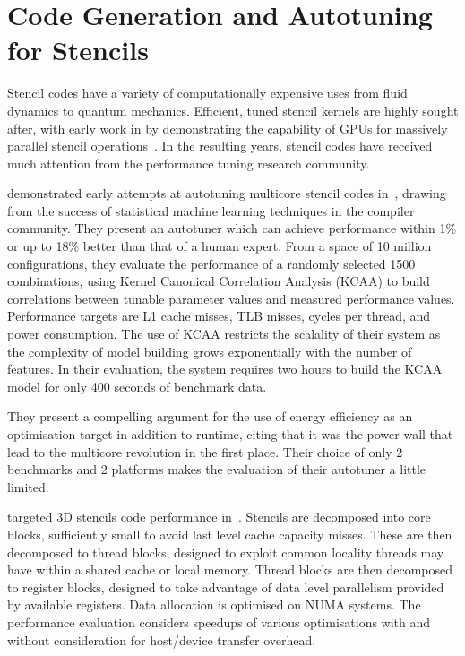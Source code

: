 

\section{Code Generation and Autotuning for Stencils}

Stencil codes have a variety of computationally expensive uses from
fluid dynamics to quantum mechanics. Efficient, tuned stencil kernels
are highly sought after, with early work in \citeyear{Bolz2003} by
\citeauthor{Bolz2003} demonstrating the capability of GPUs for
massively parallel stencil operations~\cite{Bolz2003}. In the
resulting years, stencil codes have received much attention from the
performance tuning research community.


\citeauthor{Ganapathi2009} demonstrated early attempts at autotuning
multicore stencil codes in~\cite{Ganapathi2009}, drawing from the
success of statistical machine learning techniques in the compiler
community. They present an autotuner which can achieve performance
within 1\% or up to 18\% better than that of a human expert. From a
space of 10 million configurations, they evaluate the performance of a
randomly selected 1500 combinations, using Kernel Canonical
Correlation Analysis (KCAA) to build correlations between tunable
parameter values and measured performance values. Performance targets
are L1 cache misses, TLB misses, cycles per thread, and power
consumption. The use of KCAA restricts the scalality of their system
as the complexity of model building grows exponentially with the
number of features. In their evaluation, the system requires two hours
to build the KCAA model for only 400 seconds of benchmark data.

They present a compelling argument for the use of energy efficiency as
an optimisation target in addition to runtime, citing that it was the
power wall that lead to the multicore revolution in the first
place. Their choice of only 2 benchmarks and 2 platforms makes the
evaluation of their autotuner a little limited.

\citeauthor{Berkeley2009} targeted 3D stencils code performance
in~\cite{Berkeley2009}. Stencils are decomposed into core blocks,
sufficiently small to avoid last level cache capacity misses. These
are then decomposed to thread blocks, designed to exploit common
locality threads may have within a shared cache or local
memory. Thread blocks are then decomposed to register blocks, designed
to take advantage of data level parallelism provided by available
registers. Data allocation is optimised on NUMA systems. The
performance evaluation considers speedups of various optimisations
with and without consideration for host/device transfer overhead.


